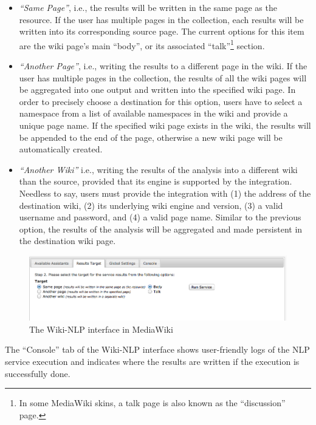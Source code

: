 \begin{itemize}\itemsep1mm
\item \emph{``Same Page''}, i.e., the results will be written in the same page as the resource. If the user has multiple pages in the collection, each results will be written into its corresponding source page. The current options for this item are the wiki page's main ``body'', or its associated ``talk''\footnote{In some MediaWiki skins, a talk page is also known as the ``discussion'' page.} section.
\item \emph{``Another Page''}, i.e., writing the results to a different page in the wiki. If the user has multiple pages in the collection, the results of all the wiki pages will be aggregated into one output and written into the specified wiki page. In order to precisely choose a destination for this option, users have to select a namespace from a list of available namespaces in the wiki and provide a unique page name. If the specified wiki page exists in the wiki, the results will be appended to the end of the page, otherwise a new wiki page will be automatically created.
\item \emph{``Another Wiki''} i.e., writing the results of the analysis into a different wiki than the source, provided that its engine is supported by the integration. Needless to say, users must provide the integration with (1) the address of the destination wiki, (2) its underlying wiki engine and version, (3) a valid username and password, and (4) a valid page name. Similar to the previous option, the results of the analysis will be aggregated and made persistent in the destination wiki page.
\end{itemize}

\begin{figure}
\centering
\includegraphics[width=\textwidth]{pictures/semassist_target.png}
\caption{The Wiki-NLP interface in MediaWiki}
\label{fig:semassist_target}
\end{figure}

The ``Console'' tab of the Wiki-NLP interface shows user-friendly logs of the NLP service execution and indicates where the results are written if the execution is successfully done.

